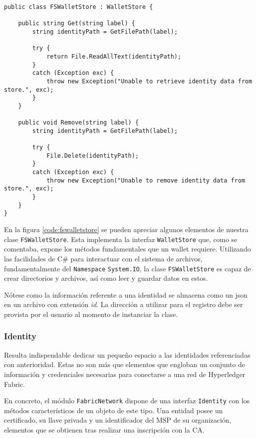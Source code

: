 \begin{lstlisting}[caption={Elementos de la clase \texttt{FSWalletStore}.}, label={code:fswalletstore}]
public class FSWalletStore : WalletStore {

	public string Get(string label) {
		string identityPath = GetFilePath(label);

		try {
			return File.ReadAllText(identityPath);
		}
		catch (Exception exc) {
			throw new Exception("Unable to retrieve identity data from store.", exc);
		}
	}

	public void Remove(string label) {
		string identityPath = GetFilePath(label);

		try {
			File.Delete(identityPath);
		}
		catch (Exception exc) {
			throw new Exception("Unable to remove identity data from store.", exc);
		}
	}
}
\end{lstlisting}

En la figura \ref{code:fswalletstore} se pueden apreciar algunos elementos de nuestra clase \texttt{FSWalletStore}. Esta implementa la interfaz \texttt{WalletStore} que, como se comentaba, expone los m\'etodos fundamentales que un wallet requiere. Utilizando las facilidades de C\# para interactuar con el sistema de archivos, fundamentalmente del \texttt{Namespace}
\texttt{System.IO}, la clase \texttt{FSWalletStore} es capaz de crear directorios y archivos, as\'i como leer y guardar datos en estos. 

N\'otese como la informaci\'on referente a una identidad se almacena como un json en un archivo con extensi\'on \emph{id}. La direcci\'on a utilizar para el registro debe ser provista por el usuario al momento de instanciar la clase.

\subsubsection{Identity}

Resulta indispendable dedicar un peque\~no espacio a las identidades referenciadas con anterioridad. Estas no son m\'as que elementos que engloban un conjunto de información y credenciales necesarias para conectarse a una red de Hyperledger Fabric.

En concreto, el m\'odulo \texttt{FabricNetwork} dispone de una interfaz \texttt{Identity} con los m\'etodos caracter\'isticos de un objeto de este tipo. Una entidad posee un certificado, su llave privada y un identificador del MSP de su organizaci\'on, elementos que se obtienen tras realizar una inscripci\'on con la CA.

